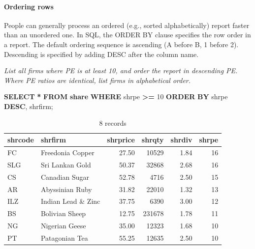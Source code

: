 \documentclass[
]{article}
\newenvironment{Shaded}{\begin{snugshade}}{\end{snugshade}}
\newcommand{\DecValTok}[1]{\textcolor[rgb]{0.00,0.00,0.81}{#1}}
\newcommand{\KeywordTok}[1]{\textcolor[rgb]{0.13,0.29,0.53}{\textbf{#1}}}
\newcommand{\NormalTok}[1]{#1}
\newcommand{\OperatorTok}[1]{\textcolor[rgb]{0.81,0.36,0.00}{\textbf{#1}}}
\begin{document}
\hypertarget{ordering-rows}{%
\paragraph*{Ordering rows}\label{ordering-rows}}

People can generally process an ordered (e.g., sorted alphabetically) report faster than an unordered one. In SQL, the ORDER BY clause specifies the row order in a report. The default ordering sequence is ascending (A before B, 1 before 2). Descending is specified by adding DESC after the column name.

\emph{List all firms where PE is at least 10, and order the report in descending PE. Where PE ratios are identical, list firms in alphabetical order.}

\begin{Shaded}
\begin{Highlighting}[]
\KeywordTok{SELECT} \OperatorTok{*} \KeywordTok{FROM} \KeywordTok{share} \KeywordTok{WHERE}\NormalTok{ shrpe }\OperatorTok{\textgreater{}=} \DecValTok{10}
  \KeywordTok{ORDER} \KeywordTok{BY}\NormalTok{ shrpe }\KeywordTok{DESC}\NormalTok{, shrfirm;}
\end{Highlighting}
\end{Shaded}

\begin{table}

\caption{\label{tab:unnamed-chunk-19}8 records}
\centering
\begin{tabular}[t]{l|l|r|r|r|r}
\hline
shrcode & shrfirm & shrprice & shrqty & shrdiv & shrpe\\
\hline
FC & Freedonia Copper & 27.50 & 10529 & 1.84 & 16\\
\hline
SLG & Sri Lankan Gold & 50.37 & 32868 & 2.68 & 16\\
\hline
CS & Canadian Sugar & 52.78 & 4716 & 2.50 & 15\\
\hline
AR & Abyssinian Ruby & 31.82 & 22010 & 1.32 & 13\\
\hline
ILZ & Indian Lead \& Zinc & 37.75 & 6390 & 3.00 & 12\\
\hline
BS & Bolivian Sheep & 12.75 & 231678 & 1.78 & 11\\
\hline
NG & Nigerian Geese & 35.00 & 12323 & 1.68 & 10\\
\hline
PT & Patagonian Tea & 55.25 & 12635 & 2.50 & 10\\
\hline
\end{tabular}
\end{table}
\end{document}
